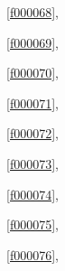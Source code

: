 \noindent\filesourcenumbernameone\ \ref{f000068},\ \pageref{f000068}%

\noindent\filesourcenumbernameone\ \ref{f000069},\ \pageref{f000069}%

\noindent\filesourcenumbernameone\ \ref{f000070},\ \pageref{f000070}%

\noindent\filesourcenumbernameone\ \ref{f000071},\ \pageref{f000071}%

\noindent\filesourcenumbernameone\ \ref{f000072},\ \pageref{f000072}%

\noindent\filesourcenumbernameone\ \ref{f000073},\ \pageref{f000073}%

\noindent\filesourcenumbernameone\ \ref{f000074},\ \pageref{f000074}%

\noindent\filesourcenumbernameone\ \ref{f000075},\ \pageref{f000075}%

\noindent\filesourcenumbernameone\ \ref{f000076},\ \pageref{f000076}%









